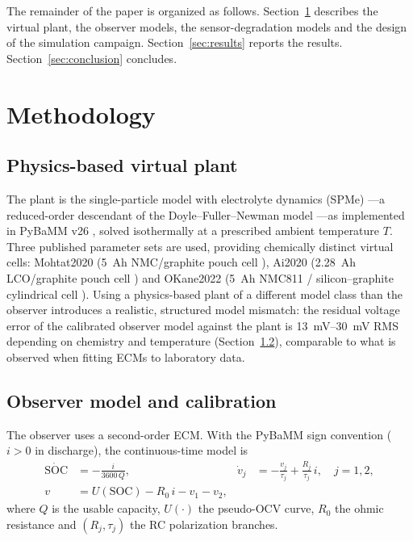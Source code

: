 \documentclass[11pt,a4paper]{article}
\newcommand{\soc}{\mathrm{SOC}}
\begin{document}
The remainder of the paper is organized as follows.
Section~\ref{sec:method} describes the virtual plant, the observer models,
the sensor-degradation models and the design of the simulation campaign.
Section~\ref{sec:results} reports the results. Section~\ref{sec:conclusion}
concludes.

\section{Methodology}
\label{sec:method}

\subsection{Physics-based virtual plant}
\label{sec:plant}

The plant is the single-particle model with electrolyte dynamics (SPMe)
\citep{marquis2019asymptotic}---a reduced-order descendant of the
Doyle--Fuller--Newman model \citep{doyle1993modeling}---as
implemented in PyBaMM v26 \citep{sulzer2021pybamm}, solved isothermally at a
prescribed ambient temperature $T$. Three published parameter sets are
used, providing chemically distinct virtual cells: Mohtat2020 (\SI{5}{Ah}
NMC/graphite pouch cell \citep{mohtat2020}), Ai2020 (\SI{2.28}{Ah}
LCO/graphite pouch cell \citep{ai2020}) and OKane2022 (\SI{5}{Ah} NMC811 /
silicon--graphite cylindrical cell \citep{okane2022,chen2020}). Using a
physics-based plant of a different model class than the observer introduces
a realistic, structured model mismatch: the residual voltage error of the
calibrated observer model against the plant is \SIrange{13}{30}{mV} RMS
depending on chemistry and temperature (Section~\ref{sec:calibration}),
comparable to what is observed when fitting ECMs to laboratory data.

\subsection{Observer model and calibration}
\label{sec:calibration}

The observer uses a second-order ECM. With the PyBaMM sign convention
($i>0$ in discharge), the continuous-time model is
\begin{align}
  \dot{\soc} &= -\frac{i}{3600\,Q}, &
  \dot{v}_j &= -\frac{v_j}{\tau_j} + \frac{R_j}{\tau_j}\, i, \quad j=1,2,
  \label{eq:ecm-states}\\
  v &= U(\soc) - R_0\, i - v_1 - v_2,
  \label{eq:ecm-output}
\end{align}
where $Q$ is the usable capacity, $U(\cdot)$ the pseudo-OCV curve, $R_0$
the ohmic resistance and $(R_j,\tau_j)$ the RC polarization branches.
\end{document}
